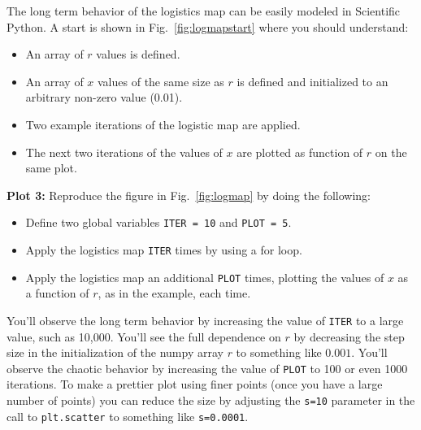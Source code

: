 The long term behavior of the logistics map can be easily modeled in Scientific Python.  A start is shown in Fig.~\ref{fig:logmapstart} where you should understand:
\begin{itemize}
\item An array of $r$ values is defined.
\item An array of $x$ values of the same size as $r$ is defined and initialized to an arbitrary non-zero value (0.01).
\item Two example iterations of the logistic map are applied.
\item The next two iterations of the values of $x$ are plotted as function of $r$ on the same plot.
\end{itemize}

\noindent
{\bf Plot 3:}  Reproduce the figure in Fig.~\ref{fig:logmap} by doing the following:
\begin{itemize}
\item Define two global variables {\tt ITER = 10} and {\tt PLOT = 5}.
\item Apply the logistics map {\tt ITER} times by using a for loop.
\item Apply the logistics map an additional {\tt PLOT} times, plotting the values of $x$ as a function of $r$, as in the example, each time.
\end{itemize}
You'll observe the long term behavior by increasing the value of {\tt ITER} to a large value, such as 10,000.
You'll see the full dependence on $r$ by decreasing the step size in the initialization of the numpy array $r$ to something like $0.001$.  You'll observe the chaotic behavior by increasing the value of {\tt PLOT} to 100 or even 1000 iterations.  To make a prettier plot using finer points (once you have a large number of points) you can reduce the size by adjusting the {\tt s=10} parameter in the call to {\tt plt.scatter} to something like {\tt s=0.0001}.  

